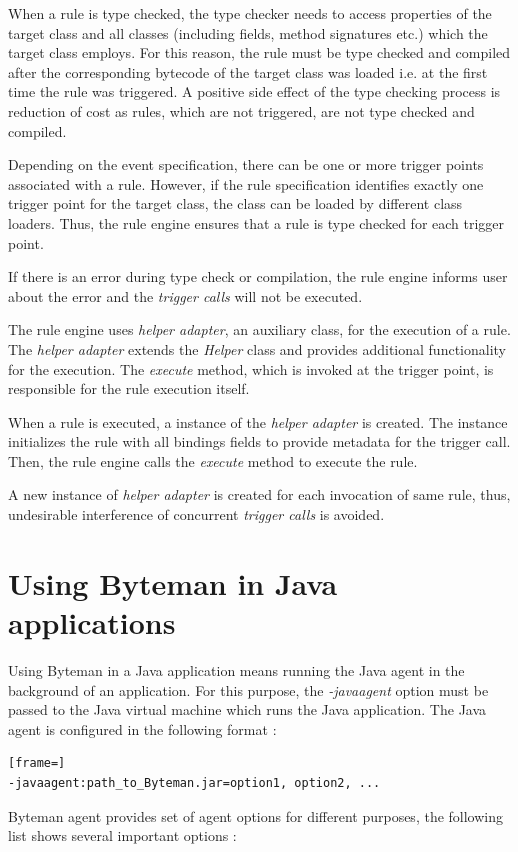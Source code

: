 \documentclass[12pt,oneside]{fithesis2}
\begin{document}
When a rule is type checked, the type checker needs to access properties of the target class and all classes (including fields, method signatures etc.) which the target class employs. For this reason, the rule must be type checked and compiled after the corresponding bytecode of the target class was loaded i.e. at the first time the rule was triggered. A positive side effect of the type checking process is reduction of cost as rules, which are not triggered, are not type checked and compiled.

Depending on the event specification, there can be one or more trigger points associated with a rule. However, if the rule specification identifies exactly one trigger point for the target class, the class can be loaded by different class loaders. Thus, the rule engine ensures that a rule is type checked for each trigger point.

If there is an error during type check or compilation, the rule engine informs user about the error and the \textit{trigger calls} will not be executed.

The rule engine uses \textit{helper adapter}, an auxiliary class, for the execution of a rule. The \textit{helper adapter} extends the \textit{Helper} class and provides additional functionality for the execution. The \textit{execute} method, which is invoked at the trigger point, is responsible for the rule execution itself.

When a rule is executed, a instance of the \textit{helper adapter} is created. The instance initializes the rule with all bindings fields to provide metadata for the trigger call. Then, the rule engine calls the \textit{execute} method to execute the rule.

A new instance of \textit{helper adapter} is created for each invocation of same rule, thus, undesirable interference of concurrent \textit{trigger calls} is avoided.

\section{Using Byteman in Java applications}
Using Byteman in a Java application means running the Java agent in the background of an application. For this purpose, the \textit{-javaagent} option must be passed to the Java virtual machine which runs the Java application. The Java agent is configured in the following format \cite[Running Applications with Byteman]{byteman_doc}:
\begin{lstlisting}[frame=]
-javaagent:path_to_Byteman.jar=option1, option2, ...
\end{lstlisting}
Byteman agent provides set of agent options for different purposes, the following list shows several important options \cite[Available -javaagent Options]{byteman_doc}:
\end{document}

